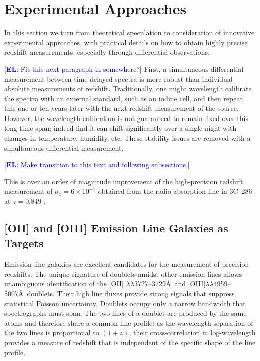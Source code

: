 \documentclass[preprint2, 10pt]{aastex}
\newcommand{\eric}[1]{\textcolor{blue}{[{\bf EL}: #1]}}
\begin{document}
\section{Experimental Approaches} \label{sec:tech} 

In this section we turn from theoretical speculation to consideration of 
innovative experimental approaches, with practical details on how to 
obtain highly precise redshift measurements, especially through differential 
observations. 

\eric{Fit this next paragraph in somewhere?} 
First, a simultaneous differential measurement between time delayed spectra 
is more robust than individual absolute measurements of redshift.  
Traditionally, one might wavelength calibrate the spectra with an external 
standard, such as an iodine cell, and then repeat this one or ten years 
later with the next redshift measurement of the source.  However, the 
wavelength calibration is not guaranteed to remain fixed over this long time 
span; indeed \citet{griest1,griest2} find it can shift significantly over a 
single 
night with changes in temperature, humidity, etc.  These stability issues 
are removed with a simultaneous differential measurement. 




\eric{Make transition to this text and following subsections.} 

This is over an order of magnitude improvement
of the high-precision redshift measurement of  $\sigma_z=6\times 10^{-7}$ obtained
from the radio absorption line in 3C~286 at $z=0.849$
\citep{1978ApJ...219....1D}.

\subsection{[OII] and [OIII] Emission Line Galaxies as Targets}
Emission line galaxies are excellent candidates for the measurement of precision redshifts.
The unique signature
of doublets amidst  other emission lines allows unambiguous identification of the [OII] $\lambda\lambda$3727--3729\AA\ 
and [OIII]$\lambda\lambda$4959--5007\AA\ doublets.
Their high line fluxes provide strong signals that suppress statistical Poisson uncertainty.
Doublets occupy only a narrow bandwidth that spectrographs must span.
The two lines of a doublet are produced by the same atoms and therefore
share a common line profile: as the wavelength separation of the two lines is proportional to $(1+z)$, their cross-correlation in log-wavelength
provides a measure of redshift that is independent of the specific shape of the line profile.
\end{document}
